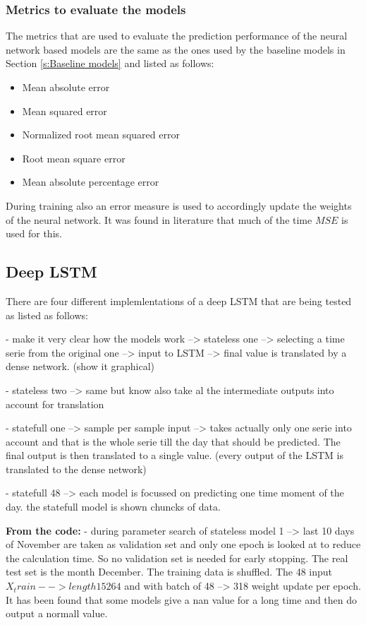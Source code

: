\subsubsection{Metrics to evaluate the models}
The metrics that are used to evaluate the prediction performance of the  neural network based models are the same as the ones used by the baseline models in Section \ref{s:Baseline models} and listed as follows:
\begin{itemize}
	\item Mean absolute error
	\item Mean squared error
	\item Normalized root mean squared error
	\item Root mean square error
	\item Mean absolute percentage error
\end{itemize}

During training also an error measure is used to accordingly update the weights of the neural network. It was found in literature that much of the time $ MSE $ is used for this.


\subsection{Deep LSTM}\label{s:LSTM_implementation}
There are four different implemlentations of a deep LSTM that are being tested as listed as follows:

- make it very clear how the models work --> stateless one --> selecting a time serie from the original one --> input to LSTM --> final value is translated by a dense network. (show it graphical)

- stateless two --> same but know also take al the intermediate outputs into account for translation 

- statefull one --> sample per sample input --> takes actually only one serie into account and that is the whole serie till the day that should be predicted. The final output is then translated to a single value. (every output of the LSTM is translated to the dense network)

- statefull 48 --> each model is focussed on predicting one time moment of the day. the statefull model is shown chuncks of data. 

\textbf{From the code:}
- during parameter search of stateless model 1 --> last 10 days of November are taken as validation set and only one epoch is looked at to reduce the calculation time. So no validation set is needed for early stopping. The real test set is the month December. The training data is shuffled. 
The 48 input $X_train --> length 15264$ and with batch of 48 --> 318 weight update per epoch.
It has been found that some models give a nan value for a long time and then do output a normall value. 


